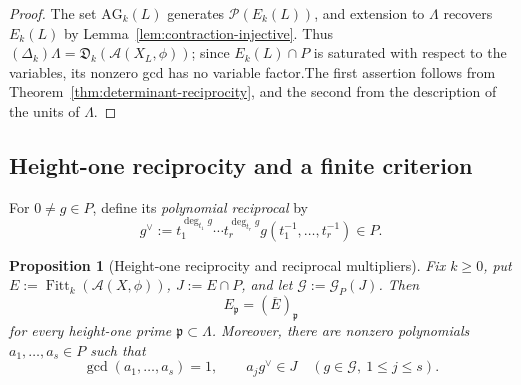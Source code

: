 \documentclass{article}
\theoremstyle{definition}
\theoremstyle{plain}
\newtheorem{proposition}[definition]{Proposition}
\newcommand{\PP}{\mathcal{P}}
\DeclareMathOperator{\gcdop}{gcd}
\newcommand{\AG}{\mathrm{AG}}
\newcommand{\Fitt}{\operatorname{Fitt}}
\begin{document}
\begin{proof}
The set \(\AG_k(L)\) generates \(\PP(E_k(L))\), and extension to
\(\Lambda\) recovers \(E_k(L)\) by
Lemma~\ref{lem:contraction-injective}.  Thus
\((\Delta_k)\Lambda=\mathfrak D_k(\mathcal A(X_L,\phi))\); since \(E_k(L)\cap P\) is saturated with respect to the variables, its nonzero gcd has no variable factor.The first
assertion follows from Theorem~\ref{thm:determinant-reciprocity}, and the
second from the description of the units of \(\Lambda\).
\end{proof}

\subsection{Height-one reciprocity and a finite criterion}
\label{subsec:height-one-reciprocity}

For \(0\ne g\in P\), define its \emph{polynomial reciprocal} by
\[
 g^\vee:=t_1^{\deg_{t_1}g}\cdots t_r^{\deg_{t_r}g}
 g(t_1^{-1},\dots,t_r^{-1})\in P.
\]

\begin{proposition}[Height-one reciprocity and reciprocal multipliers]
\label{prop:codimension-two-defect}
Fix \(k\ge0\), put
\(E:=\Fitt_k(\mathcal A(X,\phi))\), \(J:=E\cap P\), and let
\(\mathcal G:=\mathcal G_P(J)\).  Then
\[
 E_{\mathfrak p}=(\overline{E})_{\mathfrak p}
\]
for every height-one prime \(\mathfrak p\subset\Lambda\).  Moreover, there
are nonzero polynomials \(a_1,\dots,a_s\in P\) such that
\[
 \gcdop(a_1,\dots,a_s)=1,
 \qquad
 a_j g^\vee\in J
 \quad(g\in\mathcal G,\ 1\le j\le s).
\]
\end{proposition}
\end{document}
